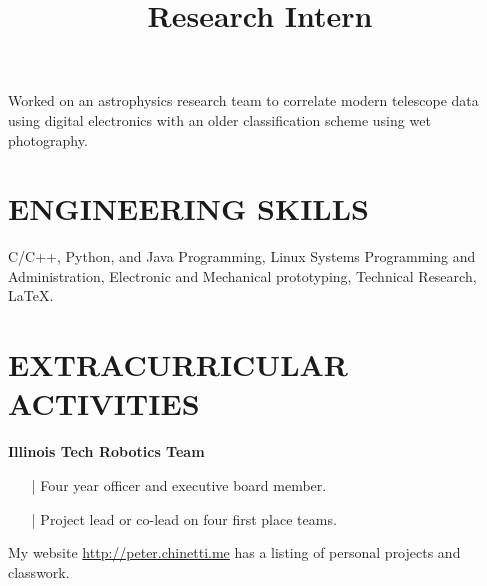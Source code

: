 \documentclass{res}
\begin{document}
\begin{resume}
\title{\bf Research Intern}
\begin{position}
      Worked on an astrophysics research team to correlate modern telescope data using digital electronics with an older classification scheme using wet photography.
\end{position}



\section{ENGINEERING SKILLS}          
 C/C++, Python, and Java Programming, Linux Systems Programming and Administration, Electronic and Mechanical prototyping, Technical Research, \LaTeX{}.
 
 
 
\section{EXTRACURRICULAR ACTIVITIES}          
        {\bf Illinois Tech Robotics Team}
        \begin{itemize}
        \item[|] Four year officer and executive board member.
        \item[|] Project lead or co-lead on four first place teams.
        \end{itemize}
        My website \url{http://peter.chinetti.me} has a listing of personal projects and classwork.
\end{resume}
\end{document}
